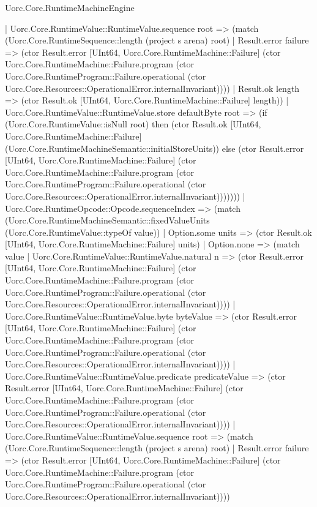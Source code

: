 \begin{lexlean}{Uorc.Core.RuntimeMachineEngine}
\begin{semanticmodule}
{              | Uorc.Core.RuntimeValue::RuntimeValue.sequence root => (match (Uorc.Core.RuntimeSequence::length (project s arena) root)
                | Result.error failure => (ctor Result.error [UInt64, Uorc.Core.RuntimeMachine::Failure] (ctor Uorc.Core.RuntimeMachine::Failure.program (ctor Uorc.Core.RuntimeProgram::Failure.operational (ctor Uorc.Core.Resources::OperationalError.internalInvariant))))
                | Result.ok length => (ctor Result.ok [UInt64, Uorc.Core.RuntimeMachine::Failure] length))
              | Uorc.Core.RuntimeValue::RuntimeValue.store defaultByte root => (if (Uorc.Core.RuntimeValue::isNull root) then (ctor Result.ok [UInt64, Uorc.Core.RuntimeMachine::Failure] (Uorc.Core.RuntimeMachineSemantic::initialStoreUnits)) else (ctor Result.error [UInt64, Uorc.Core.RuntimeMachine::Failure] (ctor Uorc.Core.RuntimeMachine::Failure.program (ctor Uorc.Core.RuntimeProgram::Failure.operational (ctor Uorc.Core.Resources::OperationalError.internalInvariant)))))))
          | Uorc.Core.RuntimeOpcode::Opcode.sequenceIndex => (match (Uorc.Core.RuntimeMachineSemantic::fixedValueUnits (Uorc.Core.RuntimeValue::typeOf value))
            | Option.some units => (ctor Result.ok [UInt64, Uorc.Core.RuntimeMachine::Failure] units)
            | Option.none => (match value
              | Uorc.Core.RuntimeValue::RuntimeValue.natural n => (ctor Result.error [UInt64, Uorc.Core.RuntimeMachine::Failure] (ctor Uorc.Core.RuntimeMachine::Failure.program (ctor Uorc.Core.RuntimeProgram::Failure.operational (ctor Uorc.Core.Resources::OperationalError.internalInvariant))))
              | Uorc.Core.RuntimeValue::RuntimeValue.byte byteValue => (ctor Result.error [UInt64, Uorc.Core.RuntimeMachine::Failure] (ctor Uorc.Core.RuntimeMachine::Failure.program (ctor Uorc.Core.RuntimeProgram::Failure.operational (ctor Uorc.Core.Resources::OperationalError.internalInvariant))))
              | Uorc.Core.RuntimeValue::RuntimeValue.predicate predicateValue => (ctor Result.error [UInt64, Uorc.Core.RuntimeMachine::Failure] (ctor Uorc.Core.RuntimeMachine::Failure.program (ctor Uorc.Core.RuntimeProgram::Failure.operational (ctor Uorc.Core.Resources::OperationalError.internalInvariant))))
              | Uorc.Core.RuntimeValue::RuntimeValue.sequence root => (match (Uorc.Core.RuntimeSequence::length (project s arena) root)
                | Result.error failure => (ctor Result.error [UInt64, Uorc.Core.RuntimeMachine::Failure] (ctor Uorc.Core.RuntimeMachine::Failure.program (ctor Uorc.Core.RuntimeProgram::Failure.operational (ctor Uorc.Core.Resources::OperationalError.internalInvariant))))
}
\end{semanticmodule}
\end{lexlean}
